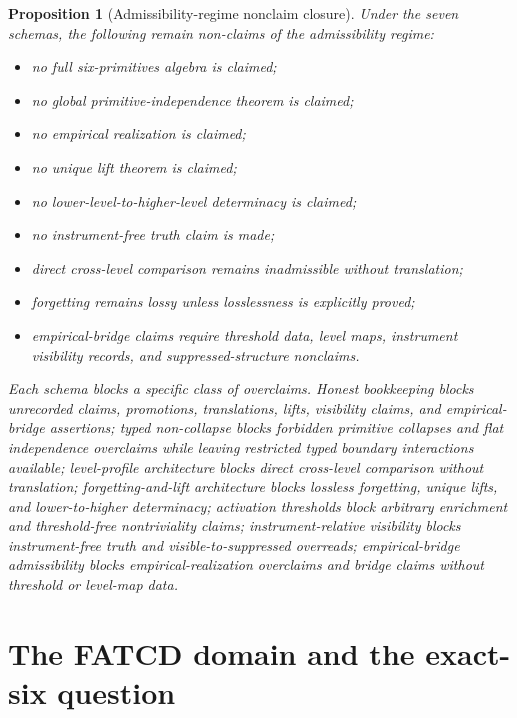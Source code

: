 \documentclass[11pt]{article}
\newtheorem{proposition}[theorem]{Proposition}
\theoremstyle{definition}
\begin{document}
\begin{proposition}[Admissibility-regime nonclaim closure]\label{prop:nonclaim-closure}
Under the seven schemas, the following remain non-claims of the
admissibility regime:
\begin{itemize}[topsep=2pt,itemsep=1pt]
  \item no full six-primitives algebra is claimed;
  \item no global primitive-independence theorem is claimed;
  \item no empirical realization is claimed;
  \item no unique lift theorem is claimed;
  \item no lower-level-to-higher-level determinacy is claimed;
  \item no instrument-free truth claim is made;
  \item direct cross-level comparison remains inadmissible without
    translation;
  \item forgetting remains lossy unless losslessness is explicitly proved;
  \item empirical-bridge claims require threshold data, level maps,
    instrument visibility records, and suppressed-structure nonclaims.
\end{itemize}
Each schema blocks a specific class of overclaims. Honest bookkeeping blocks
unrecorded claims, promotions, translations, lifts, visibility claims, and
empirical-bridge assertions; typed non-collapse blocks forbidden primitive
collapses and flat independence overclaims while leaving restricted typed
boundary interactions available; level-profile architecture blocks direct
cross-level comparison without translation; forgetting-and-lift architecture
blocks lossless forgetting, unique lifts, and lower-to-higher determinacy;
activation thresholds block arbitrary enrichment and threshold-free
nontriviality claims; instrument-relative visibility blocks instrument-free
truth and visible-to-suppressed overreads; empirical-bridge admissibility
blocks empirical-realization overclaims and bridge claims without threshold or
level-map data.
\end{proposition}
 \section{The FATCD domain and the exact-six question}\label{sec:fatcd-domain}
\end{document}
